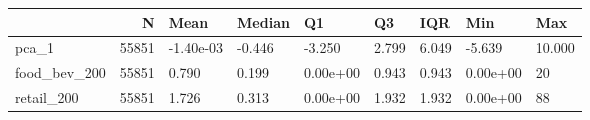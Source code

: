 \begin{tabular}{lrlllllll}
\toprule
 & N & Mean & Median & Q1 & Q3 & IQR & Min & Max \\
\midrule
pca\_1 & 55851 & -1.40e-03 & -0.446 & -3.250 & 2.799 & 6.049 & -5.639 & 10.000 \\
food\_bev\_200 & 55851 & 0.790 & 0.199 & 0.00e+00 & 0.943 & 0.943 & 0.00e+00 & 20 \\
retail\_200 & 55851 & 1.726 & 0.313 & 0.00e+00 & 1.932 & 1.932 & 0.00e+00 & 88 \\
\bottomrule
\end{tabular}
